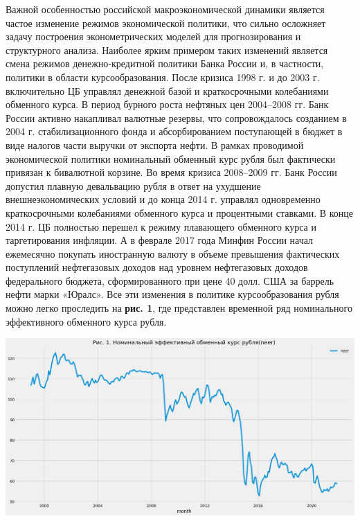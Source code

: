 \documentclass{article}
\begin{document}
Важной особенностью российской макроэкономической динамики является частое изменение режимов экономической политики, что сильно осложняет задачу построения эконометрических моделей для прогнозирования и структурного анализа. Наиболее ярким примером таких изменений является смена режимов денежно‐кредитной политики Банка России и, в частности, политики в области курсообразования. После кризиса 1998 г. и до 2003 г. включительно ЦБ управлял денежной базой и краткосрочными колебаниями обменного курса. В период бурного роста нефтяных цен 2004–2008 гг. Банк России активно накапливал валютные резервы, что сопровождалось созданием в 2004 г. стабилизационного фонда и абсорбированием поступающей в бюджет в виде налогов части выручки от экспорта нефти. В рамках проводимой экономической политики номинальный обменный курс рубля был фактически привязан к бивалютной корзине. Во время кризиса 2008–2009 гг. Банк России допустил плавную девальвацию рубля в ответ на ухудшение внешнеэкономических условий и до конца 2014 г. управлял одновременно краткосрочными колебаниями обменного курса и процентными ставками. В конце 2014 г. ЦБ полностью перешел к режиму плавающего обменного курса и таргетирования инфляции. А в феврале 2017 года Минфин России начал ежемесячно покупать иностранную валюту в объеме превышения фактических поступлений нефтегазовых доходов над уровнем нефтегазовых доходов федерального бюджета, сформированного при цене 40 долл. США за баррель нефти марки «Юралс». Все эти изменения в политике курсообразования рубля можно легко проследить на \textbf{рис. 1}, где представлен временной ряд номинального эффективного обменного курса рубля.

\begin{center}
\includegraphics[width=150mm]{pics/neer.png}
\end{center}
\end{document}
